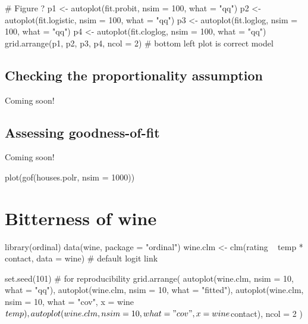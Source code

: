 \begin{example}
# Figure ?
p1 <- autoplot(fit.probit, nsim = 100, what = "qq")
p2 <- autoplot(fit.logistic, nsim = 100, what = "qq")
p3 <- autoplot(fit.loglog, nsim = 100, what = "qq")
p4 <-  autoplot(fit.cloglog, nsim = 100, what = "qq")
grid.arrange(p1, p2, p3, p4, ncol = 2)  # bottom left plot is correct model
\end{example}


\subsection{Checking the proportionality assumption}

Coming soon!


\subsection{Assessing goodness-of-fit}

Coming soon!

\begin{example}
plot(gof(houses.polr, nsim = 1000))
\end{example}


\section{Bitterness of wine}

\begin{example}
library(ordinal)
data(wine, package = "ordinal")
wine.clm <- clm(rating ~ temp * contact, data = wine)  # default logit link
\end{example}

\begin{example}
set.seed(101)  # for reproducibility
grid.arrange(
  autoplot(wine.clm, nsim = 10, what = "qq"),
  autoplot(wine.clm, nsim = 10, what = "fitted"),
  autoplot(wine.clm, nsim = 10, what = "cov", x = wine$temp),
  autoplot(wine.clm, nsim = 10, what = "cov", x = wine$contact),
  ncol = 2
)
\end{example}

